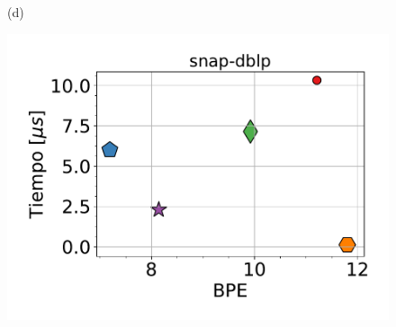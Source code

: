 \begin{figure}
\begin{minipage}{1\textwidth}
\begin{minipage}{0.45\textwidth}
    			(d)
    		\end{minipage}  
    	\end{minipage}
    	
        \begin{minipage}{1\textwidth}
    		\centering
    		\begin{minipage}{0.45\textwidth}
    			\centering
    			\begin{minipage}{0.75\textwidth}
    				\centering
    				\includegraphics[width=1\linewidth]{img/bpeTimes/aleatorio/snap-dblp.pdf}
    			\end{minipage}
    			\begin{minipage}{0.2\textwidth}
    				\centering

\end{minipage}
\end{minipage}
\end{minipage}
\end{figure}
